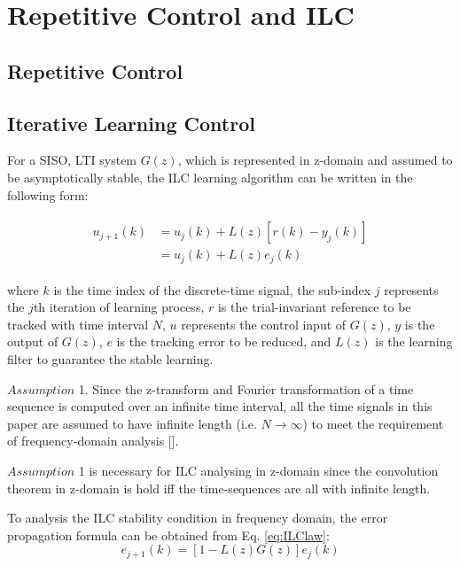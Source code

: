 \documentclass[a4paper, 12pt, twoside, openright]{mythesis}
\begin{document}
\section{Repetitive Control and ILC}
\label{sec: Repetitive Control and ILC}


\subsection{Repetitive Control}
\label{sec: Repetitive Control}

\subsection{Iterative Learning Control}
\label{sec: Iterative Learning Control}

  For a SISO, LTI system $G(z)$, which is represented in z-domain and assumed to be asymptotically stable, the ILC learning algorithm can be written in the following form:

\begin{align}
\begin{split}
u_{j+1}(k)& = u_j(k)+L(z)[r(k)-y_j(k)]\\
& = u_j(k)+L(z)e_j(k)
\end{split}
\label{eq:ILClaw}
\end{align}


where $k$ is the time index of the discrete-time signal, the sub-index $j$ represents the $j$th iteration of learning process, $r$ is the trial-invariant reference to be tracked with time interval $N$, $u$ represents the control input of $G(z)$, $y$ is the output of  $G(z)$, $e$ is the tracking error to be reduced, and $L(z)$ is the learning filter to guarantee the stable learning.
 
{$Assumption$ 1.}
Since the z-transform and Fourier transformation of a time sequence is computed over an infinite time interval, all the time signals in this paper are assumed to have infinite length (i.e. $N$$\rightarrow$$\infty$) to meet the requirement of frequency-domain analysis [\cite{silverman1973deconvolution}]. 

$Assumption$ 1 is necessary for ILC analysing in z-domain since the convolution theorem in z-domain is hold iff the time-sequences are all with infinite length.

To analysis the ILC stability condition in frequency domain, the error propagation formula can be obtained from Eq. \ref{eq:ILClaw}:
\begin{equation}
e_{j+1}(k)= [1-L(z)G(z)]e_j(k)
\label{eq:ILCerr}
\end{equation}
\end{document}
